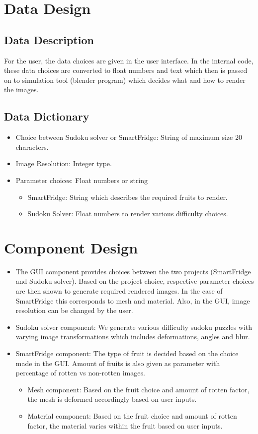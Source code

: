 \documentclass[a4paper,12pt]{article}
\begin{document}
\section{Data Design}
\subsection{Data Description}
For the user, the data choices are given in the user interface. In the internal code, these data choices are converted to float numbers and text which then is passed on to simulation tool (blender program) which decides what and how to render the images.
\subsection{Data Dictionary}
\begin{itemize}
\item Choice between Sudoku solver or SmartFridge: String of maximum size 20 characters.
\item Image Resolution: Integer type.
\item Parameter choices: Float numbers or string
\begin{itemize}
\item SmartFridge: String which describes the required fruits to render.
\item Sudoku Solver: Float numbers to render various difficulty choices.
\end{itemize}
\end{itemize}
\section{Component Design}
\begin{itemize}
\item  The GUI component provides choices between the two projects (SmartFridge and Sudoku solver). Based on the project choice, respective parameter choices are then shown to generate required rendered images. In the case of SmartFridge this corresponds to mesh and material. Also, in the GUI, image resolution can be changed by the user.
\item Sudoku solver component: We generate various difficulty sudoku puzzles with varying image transformations which includes deformations, angles and blur.
\item SmartFridge component: The type of fruit is decided based on the choice made in the GUI. Amount of fruits is also given as parameter with percentage of rotten vs non-rotten images.
\begin{itemize}
\item Mesh component: Based on the fruit choice and amount of rotten factor, the mesh is deformed accordingly based on user inputs.
\item Material component: Based on the fruit choice and amount of rotten factor, the material varies within the fruit based on user inputs.
\end{itemize}
\end{itemize}
\end{document}
